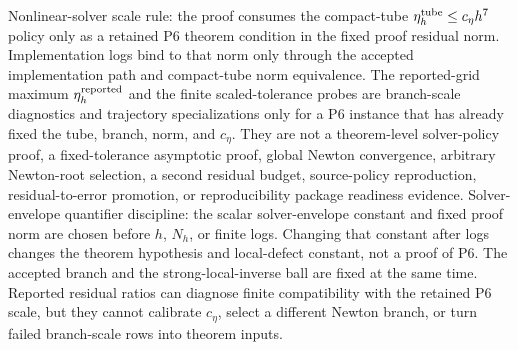 \documentclass[preprint,12pt]{elsarticle}
\begin{document}
Nonlinear-solver scale rule: the proof consumes the
compact-tube \(\eta_h^{\rm tube}\le c_\eta h^7\) policy only as a retained P6
theorem condition in the fixed proof residual norm. Implementation logs bind
to that norm only through the accepted implementation path and compact-tube
norm equivalence. The reported-grid maximum \(\eta_h^{\rm reported}\) and the finite
scaled-tolerance probes are branch-scale diagnostics and trajectory
specializations only for a P6 instance that has already fixed the tube,
branch, norm, and \(c_\eta\). They are not a theorem-level solver-policy proof,
a fixed-tolerance asymptotic proof, global Newton convergence, arbitrary
Newton-root selection, a second residual budget, source-policy reproduction,
residual-to-error promotion, or reproducibility package readiness evidence.
Solver-envelope quantifier discipline: the scalar solver-envelope constant and fixed
proof norm are chosen before \(h\), \(N_h\), or finite logs. Changing that
constant after logs changes the theorem hypothesis and local-defect constant,
not a proof of P6.
The accepted branch and the strong-local-inverse ball are fixed at the same
time. Reported residual ratios can diagnose finite compatibility with the
retained P6 scale, but they cannot calibrate \(c_\eta\), select a different
Newton branch, or turn failed branch-scale rows into theorem inputs.
\end{document}
